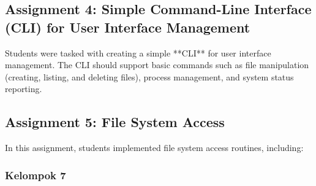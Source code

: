 \documentclass[12pt]{article}
\begin{document}
\subsection{Assignment 4: Simple Command-Line Interface (CLI) for User Interface Management}
Students were tasked with creating a simple **CLI** for user interface management. The CLI should support basic commands such as file manipulation (creating, listing, and deleting files), process management, and system status reporting.

\subsection{Assignment 5: File System Access}
In this assignment, students implemented file system access routines, including:
\subsubsection{Kelompok 7}
\end{document}
